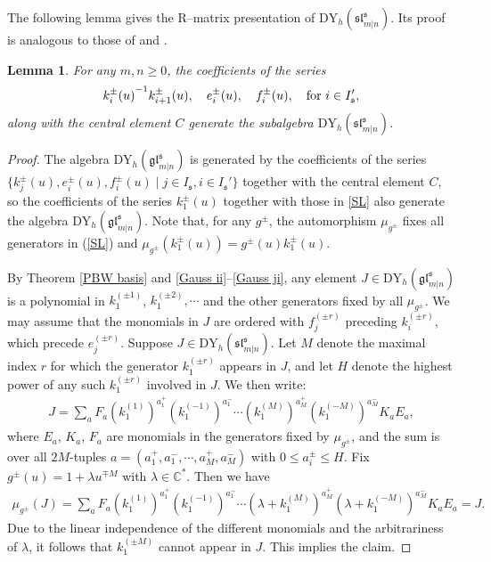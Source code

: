\documentclass[a4paper,12pt]{article}
\newtheorem{lemm}[theo]{Lemma}
\numberwithin{equation}{section}
\begin{document}
The following lemma gives the R--matrix presentation of $\mathrm{DY}_{h}(\mathfrak{sl}^{\mathfrak{s}}_{m|n})$. Its proof is analogous to those of \cite[Lemma 4.7]{XLZ} and \cite[Lemma 7]{G07}.
\begin{lemm} \label{SL RTT}
For any $m,n\geqslant 0$, the coefficients of the series
\begin{equation}\label{SL}
{k_{i}^{\pm}(u)}^{-1}k_{i+1}^{\pm}(u),\quad e_{i}^{\pm}(u),\quad f_{i}^{\pm}(u), \quad {\rm for~} i\in I_{\mathfrak{s}}',
\end{equation}
along with the central element $C$ generate the subalgebra $\mathrm{DY}_{h}(\mathfrak{sl}^{\mathfrak{s}}_{m|n})$.
\end{lemm}
\begin{proof}
The algebra $\mathrm{DY}_{h}(\mathfrak{gl}^{\mathfrak{s}}_{m|n})$ is generated by the coefficients of the series $\{k_{j}^{\pm}(u),e_i^{\pm}(u), f_{i}^{\pm}(u)\mid j\in I_{\mathfrak{s}}, i\in I_{\mathfrak{s}}'\}$ together with the central element $C$, so the coefficients of the series $k_{1}^{\pm}(u)$ together with those in \eqref{SL} also generate the algebra $\mathrm{DY}_{h}(\mathfrak{gl}^{\mathfrak{s}}_{m|n})$. Note that, for any $g^{\pm}$, the automorphism $\mu_{g^{\pm}}$ fixes all generators in (\ref{SL}) and $\mu_{g^{\pm}}(k_{1}^{\pm}(u))=g^{\pm}(u)k_{1}^{\pm}(u)$.

By Theorem \ref{PBW basis} and \eqref{Gauss ii}--\eqref{Gauss ji}, any element $J\in \mathrm{DY}_{h}(\mathfrak{gl}^{\mathfrak{s}}_{m|n})$ is a polynomial in $k_{1}^{(\pm 1)}$, $k_{1}^{(\pm 2)}, \cdots$ and the other generators fixed by all $\mu_{g^{\pm}}$.  We may assume that the monomials in $J$ are ordered with $f_{j}^{(\pm r)}$ preceding $k_{i}^{(\pm r)}$, which precede $e_{j}^{(\pm r)}$. Suppose $J\in \mathrm{DY}_{h}(\mathfrak{sl}^{\mathfrak{s}}_{m|n})$. Let $M$ denote the maximal index $r$ for which the generator $k_{1}^{(\pm r)}$ appears in $J$, and let $H$ denote the highest power of any such $k_{1}^{(\pm r)}$ involved in $J$. We then write:
\begin{align*}
J=\sum_{a}F_a(k_{1}^{(1)})^{a_1^+}(k_{1}^{(-1)})^{a_1^-}\cdots
(k_{1}^{(M)})^{a_M^+}(k_{1}^{(-M)})^{a_M^-}K_aE_a,
\end{align*}
where $E_a$, $K_a$, $F_a$ are monomials in the generators fixed by $\mu_{g^{\pm}}$, and the sum is over all $2M$-tuples $a=(a_1^{+},a_1^{-},\cdots,a_M^{+},a_M^-)$ with $0\leqslant a_{i}^{\pm}\leqslant H$. Fix $g^{\pm}(u)=1+\lambda u^{\mp M}$ with $\lambda\in\mathbb{C}^{*}$. Then we have
\begin{align*}
\mu_{g^{\pm}}(J)=\sum_{a}F_a(k_{1}^{(1)})^{a_1^+}(k_{1}^{(-1)})^{a_1^-}\cdots(\lambda+k_{1}^{(M)})^{a_M^+}(\lambda+k_{1}^{(-M)})^{a_M^-}K_aE_a=J.
\end{align*}
Due to the linear independence of the different monomials and the arbitrariness of $\lambda$, it follows that $k_{1}^{(\pm M)}$ cannot appear in $J$. This implies the claim.
\end{proof}
\end{document}
